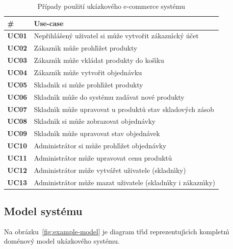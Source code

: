 \begin{table}[h]
    \centering
    \begin{tabular*}{\textwidth}{ l l }
        \hline
        \textbf{\#} & \textbf{Use-case} \\
        \hline \hline
        \textbf{UC01} & Nepřihlášen\'y uživatel si může vytvořit zákazn\'{\i}ck\'y účet \\
        \textbf{UC02} & Zákazn\'{\i}k může prohl\'{\i}žet produkty \\
        \textbf{UC03} & Zákazn\'{\i}k může vkládat produkty do koš\'{\i}ku \\
        \textbf{UC04} & Zákazn\'{\i}k může vytvořit objednávku \\
        \textbf{UC05} & Skladn\'{\i}k si může prohl\'{\i}žet produkty \\
        \textbf{UC06} & Skladn\'{\i}k může do systému zadávat nové produkty \\
        \textbf{UC07} & Skladn\'{\i}k může upravovat u produktů stav skladov\'ych zásob \\
        \textbf{UC08} & Skladn\'{\i}k si může zobrazovat objednávky \\
        \textbf{UC09} & Skladn\'{\i}k může upravovat stav objednávek \\
        \textbf{UC10} & Administrátor si může prohl\'{\i}žet objednávky \\
        \textbf{UC11} & Administrátor může upravovat cenu produktů \\
        \textbf{UC12} & Administrátor může vytvářet uživatele (skladn\'{\i}ky) \\
        \textbf{UC13} & Administrátor může mazat uživatele (skladn\'{\i}ky i zákazn\'{\i}ky) \\
        \hline
    \end{tabular*}
    \caption{Případy použití ukázkového e-commerce systému}
    \label{tbl:use-cases}
\end{table}

\subsection{Model systému}

Na obrázku~\ref{fig:example-model} je diagram tř\'{\i}d reprezentuj\'{\i}c\'{\i}ch
kompletn\'{\i} doménov\'y model ukázkového systému.

